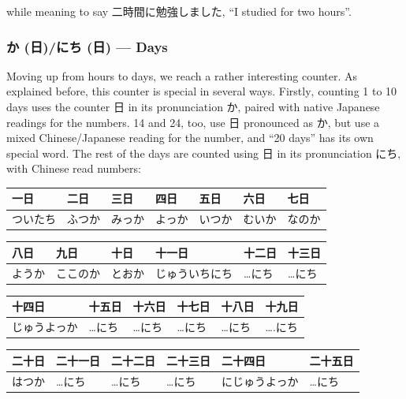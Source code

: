 \documentclass[11pt, b5paper, twoside, openright, onecolumn]{book}
\makeatletter
\newcommand*{\rubystack}[2]{{\relscale{0.5}%
  \begin{tabular}[b]{@{}c@{}}%
    {#1}\\%
   {\textscale{2}{#2}}%
  \end{tabular}}%
}
\DeclareRobustCommand*{\ruby}[2]{%
  \mbox{%
    \setlength{\parskip}{0ex}%
    \BeginAccSupp{method=pdfstringdef,ActualText={#1}}%
      \rubystack{\phantom{#2}}{#1}%
      \llap{%
        \rubystack{#2}{\phantom{#1}}%
      }%
    \EndAccSupp{}%
  }%
}
\renewcommand*{\ruby}[2]{#2 (#1)}%
\newenvironment{mytabular}[1]{\noindent\hspace{0.4in}
\begin{tabular}[h]{#1}}{\end{tabular}}
\newenvironment{mytabularcentered}[1]{\noindent
\begin{center}\begin{tabular}[h]{#1}}{\end{tabular}\end{center}}
\makeatother
\begin{document}
while meaning to say 二時間に勉強しました‚ “I studied for two hours”.

\subsubsection{\ruby{日}{か}/\ruby{日}{にち} — Days}

Moving up from hours to days‚ we reach a rather interesting counter. As explained before‚ this counter is special in several ways. Firstly‚ counting 1 to 10 days uses the counter 日 in its pronunciation か‚ paired with native Japanese readings for the numbers. 14 and 24‚ too‚ use 日 pronounced as か‚ but use a mixed Chinese/Japanese reading for the number‚ and “20 days” has its own special word. The rest of the days are counted using 日 in its pronunciation にち‚ with Chinese read numbers:

\vspace{0.5cm}
\smaller
\begin{mytabular}{| l  l  l  l  l  l  l |}\hline 
\rule{0pt}{2.4ex}一日 & 二日 & 三日 & 四日 & 五日 & 六日 & 七日\\ 
\hline
\rule{0pt}{2.4ex}ついたち & ふつか & みっか & よっか & いつか & むいか & なのか\\ 
\hline 
\end{mytabular}
\larger
\vspace{0.5cm}

\smaller
\begin{mytabular}{| l  l  l  l  l  l |}\hline 
\rule{0pt}{2.4ex}八日 & 九日 & 十日 & 十一日 & 十二日 & 十三日\\ 
\hline
\rule{0pt}{2.4ex}ようか & ここのか & とおか & じゅういちにち & …にち & …にち\\ 
\hline 
\end{mytabular}
\larger
\vspace{0.5cm}

\smaller
\begin{mytabular}{| l  l  l  l  l  l |}\hline 
\rule{0pt}{2.4ex}十四日 & 十五日 & 十六日 & 十七日 & 十八日 & 十九日\\ 
\hline
\rule{0pt}{2.4ex}じゅうよっか & …にち & …にち & …にち & …にち & ….にち\\ 
\hline 
\end{mytabular}
\larger
\vspace{0.5cm}

\smaller
\begin{center}
\begin{mytabularcentered}{| l  l  l  l  l  l |}\hline 
\rule{0pt}{2.4ex}二十日 & 二十一日 & 二十二日 & 二十三日 & 二十四日 & 二十五日\\ 
\hline
\rule{0pt}{2.4ex}\index[japanese]{はつか (二十日)}はつか & …にち & …にち & …にち & にじゅうよっか & …にち\\ 
\hline 
\end{mytabularcentered}
\end{center}
\larger
\vspace{0.5cm}
\end{document}
